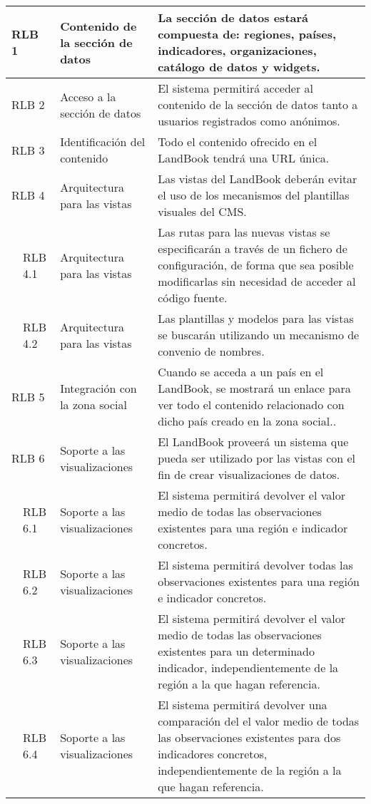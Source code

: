 \begin{longtable}[c]{|p{1mm}|p{14mm}|p{30mm}|p{90mm}|}
\multicolumn{2}{|l|}{RLB 1}  & Contenido de la sección de datos & La sección de datos estará compuesta de: regiones, países, indicadores, organizaciones, catálogo de datos y widgets. \\
\hline
\multicolumn{2}{|l|}{RLB 2}  & Acceso a la sección de datos & El sistema permitirá acceder al contenido de la sección de datos tanto a usuarios registrados como anónimos. \\
\hline
\multicolumn{2}{|l|}{RLB 3}  & Identificación del contenido & Todo el contenido ofrecido en el LandBook tendrá una URL única. \\
\hline
\multicolumn{2}{|l|}{RLB 4}  & Arquitectura para las vistas & Las vistas del LandBook deberán evitar el uso de los mecanismos del plantillas visuales del CMS. \\
\hline
 & RLB 4.1 & Arquitectura para las vistas & Las rutas para las nuevas vistas se especificarán a través de un fichero de configuración, de forma que sea posible modificarlas sin necesidad de acceder al código fuente. \\
\hline
 & RLB 4.2 & Arquitectura para las vistas & Las plantillas y modelos para las vistas se buscarán utilizando un mecanismo de convenio de nombres. \\
\hline
\multicolumn{2}{|l|}{RLB 5}  & Integración con la zona social & Cuando se acceda a un país en el LandBook, se mostrará un enlace para ver todo el contenido relacionado con dicho país creado en la zona social.. \\
\hline
\multicolumn{2}{|l|}{RLB 6}  & Soporte a las visualizaciones & El LandBook proveerá un sistema que pueda ser utilizado por las vistas con el fin de crear visualizaciones de datos. \\
\hline
& RLB 6.1 & Soporte a las visualizaciones & El sistema permitirá devolver el valor medio de todas las observaciones existentes para una región e indicador concretos. \\
\hline
& RLB 6.2 & Soporte a las visualizaciones & El sistema permitirá devolver todas las observaciones existentes para una región e indicador concretos. \\
\hline
& RLB 6.3 & Soporte a las visualizaciones & El sistema permitirá devolver el valor medio de todas las observaciones existentes para un determinado indicador, independientemente de la región a la que hagan referencia. \\
\hline
& RLB 6.4 & Soporte a las visualizaciones & El sistema permitirá devolver una comparación del el valor medio de todas las observaciones existentes para dos indicadores concretos, independientemente de la región a la que hagan referencia. \\

\end{longtable}
